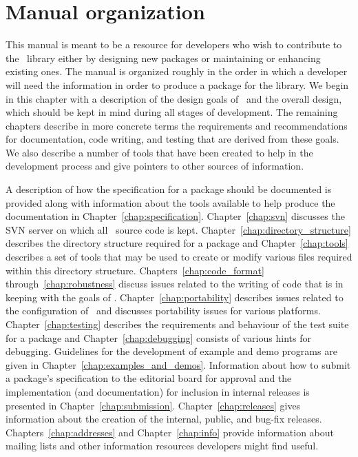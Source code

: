 \section{Manual organization\label{sec:manual_org}}

This manual is meant to be a resource for developers who wish to contribute
to the \cgal\ library either by designing new packages or maintaining
or enhancing existing ones. The manual is organized roughly in the order in
which a developer will need the information in order to produce a package
for the library. We begin in this chapter with a description
of the design goals of \cgal\ and the overall design, which should be kept
in mind during all stages of development.  The remaining chapters describe
in more concrete terms the requirements and recommendations for documentation,
code writing, and testing that are derived from these goals.  We also describe
a number of tools that have been created to help in the development process
and give pointers to other sources of information.

A description of how the specification
for a package should be documented is provided along with information about
the tools available to help produce the documentation
in Chapter~\ref{chap:specification}.
Chapter~\ref{chap:svn} discusses the SVN server on which all \cgal\ source
code is kept.
Chapter~\ref{chap:directory_structure} describes the directory structure
required for a package and Chapter~\ref{chap:tools} describes a set of tools
that may be used to create or modify various files required within this
directory structure. Chapters~\ref{chap:code_format}
through~\ref{chap:robustness}
discuss issues related to the writing of code that is in keeping with
the goals of \cgal.  Chapter~\ref{chap:portability} describes issues
related to the configuration of \cgal\ and
discusses portability issues for various platforms. Chapter~\ref{chap:testing}
describes the requirements and behaviour of the test suite for a package and
Chapter~\ref{chap:debugging} consists of various hints for debugging.
Guidelines for the development of example and demo programs are given in
Chapter~\ref{chap:examples_and_demos}. Information
about how to submit a package's specification to the editorial board
for approval and the implementation (and documentation) for inclusion in
internal releases is presented in  Chapter~\ref{chap:submission}.
Chapter~\ref{chap:releases} gives information about the creation of the
internal, public, and bug-fix releases.
Chapters~\ref{chap:addresses} and Chapter~\ref{chap:info}
provide information about mailing lists and other information
resources developers might find useful.
